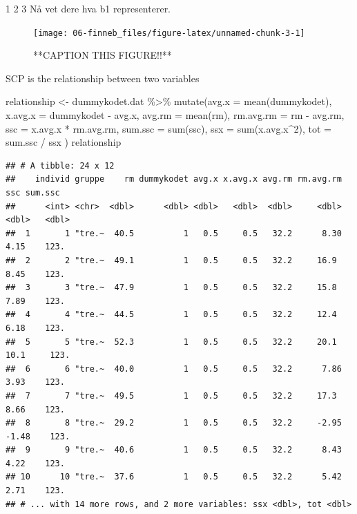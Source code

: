 \documentclass[
]{book}
\newenvironment{Shaded}{\begin{snugshade}}{\end{snugshade}}
\newcommand{\AttributeTok}[1]{\textcolor[rgb]{0.77,0.63,0.00}{#1}}
\newcommand{\DecValTok}[1]{\textcolor[rgb]{0.00,0.00,0.81}{#1}}
\newcommand{\FunctionTok}[1]{\textcolor[rgb]{0.00,0.00,0.00}{#1}}
\newcommand{\NormalTok}[1]{#1}
\newcommand{\OtherTok}[1]{\textcolor[rgb]{0.56,0.35,0.01}{#1}}
\newcommand{\SpecialCharTok}[1]{\textcolor[rgb]{0.00,0.00,0.00}{#1}}
\begin{document}
1 2 3 Nå vet dere hva b1 representerer.

\begin{figure}

{\centering \texttt{[image: 06-finneb\_files/figure-latex/unnamed-chunk-3-1]} 

}

\caption{**CAPTION THIS FIGURE!!**}\label{fig:unnamed-chunk-3}
\end{figure}

SCP is the relationship between two variables

\begin{Shaded}
\begin{Highlighting}[]
\NormalTok{relationship }\OtherTok{\textless{}{-}}\NormalTok{ dummykodet.dat }\SpecialCharTok{\%\textgreater{}\%}
  \FunctionTok{mutate}\NormalTok{(}\AttributeTok{avg.x =} \FunctionTok{mean}\NormalTok{(dummykodet),}
         \AttributeTok{x.avg.x =}\NormalTok{ dummykodet }\SpecialCharTok{{-}}\NormalTok{ avg.x,}
         \AttributeTok{avg.rm =} \FunctionTok{mean}\NormalTok{(rm),}
         \AttributeTok{rm.avg.rm =}\NormalTok{ rm }\SpecialCharTok{{-}}\NormalTok{ avg.rm, }
         \AttributeTok{ssc =}\NormalTok{ x.avg.x }\SpecialCharTok{*}\NormalTok{ rm.avg.rm, }
         \AttributeTok{sum.ssc =} \FunctionTok{sum}\NormalTok{(ssc),}
         \AttributeTok{ssx =} \FunctionTok{sum}\NormalTok{(x.avg.x}\SpecialCharTok{\^{}}\DecValTok{2}\NormalTok{),}
         \AttributeTok{tot =}\NormalTok{ sum.ssc }\SpecialCharTok{/}\NormalTok{ ssx}
\NormalTok{         )}
\NormalTok{relationship}
\end{Highlighting}
\end{Shaded}

\begin{verbatim}
## # A tibble: 24 x 12
##    individ gruppe    rm dummykodet avg.x x.avg.x avg.rm rm.avg.rm   ssc sum.ssc
##      <int> <chr>  <dbl>      <dbl> <dbl>   <dbl>  <dbl>     <dbl> <dbl>   <dbl>
##  1       1 "tre.~  40.5          1   0.5     0.5   32.2      8.30  4.15    123.
##  2       2 "tre.~  49.1          1   0.5     0.5   32.2     16.9   8.45    123.
##  3       3 "tre.~  47.9          1   0.5     0.5   32.2     15.8   7.89    123.
##  4       4 "tre.~  44.5          1   0.5     0.5   32.2     12.4   6.18    123.
##  5       5 "tre.~  52.3          1   0.5     0.5   32.2     20.1  10.1     123.
##  6       6 "tre.~  40.0          1   0.5     0.5   32.2      7.86  3.93    123.
##  7       7 "tre.~  49.5          1   0.5     0.5   32.2     17.3   8.66    123.
##  8       8 "tre.~  29.2          1   0.5     0.5   32.2     -2.95 -1.48    123.
##  9       9 "tre.~  40.6          1   0.5     0.5   32.2      8.43  4.22    123.
## 10      10 "tre.~  37.6          1   0.5     0.5   32.2      5.42  2.71    123.
## # ... with 14 more rows, and 2 more variables: ssx <dbl>, tot <dbl>
\end{verbatim}
\end{document}
